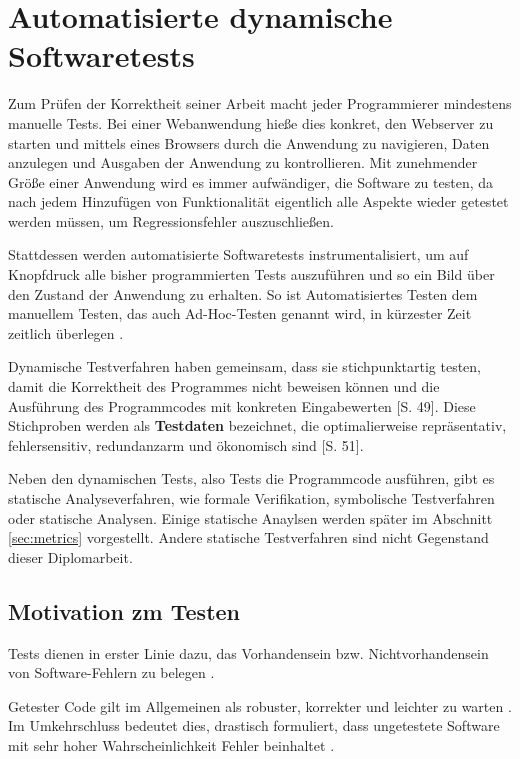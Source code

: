 \section{Automatisierte dynamische Softwaretests}

Zum Prüfen der Korrektheit seiner Arbeit macht jeder Programmierer mindestens manuelle Tests. Bei einer Webanwendung hieße dies konkret, den Webserver zu starten und mittels eines Browsers durch die Anwendung zu navigieren, Daten anzulegen und Ausgaben der Anwendung zu kontrollieren. Mit zunehmender Größe einer Anwendung wird es immer aufwändiger, die Software zu testen, da nach jedem Hinzufügen von Funktionalität eigentlich alle Aspekte wieder getestet werden müssen, um Regressionsfehler auszuschließen.

Stattdessen werden automatisierte Softwaretests instrumentalisiert, um auf Knopfdruck alle bisher programmierten Tests auszuführen und so ein Bild über den Zustand der Anwendung zu erhalten. So ist Automatisiertes Testen dem manuellem Testen, das auch Ad-Hoc-Testen genannt wird, in kürzester Zeit zeitlich überlegen \citep{rappin_rails_2011}.

Dynamische Testverfahren haben gemeinsam, dass sie stichpunktartig testen, damit die Korrektheit des Programmes nicht beweisen können und die Ausführung des Programmcodes mit konkreten Eingabewerten \cite{liggesmeyer_modultest_1990}[S. 49]. Diese Stichproben werden als \textbf{Testdaten} bezeichnet, die optimalierweise repräsentativ, fehlersensitiv, redundanzarm und ökonomisch sind \citep{liggesmeyer_modultest_1990}[S. 51].

Neben den dynamischen Tests, also Tests die Programmcode ausführen, gibt es statische Analyseverfahren, wie formale Verifikation, symbolische Testverfahren oder statische Analysen. Einige statische Anaylsen werden später im Abschnitt \ref{sec:metrics} vorgestellt. Andere statische Testverfahren sind nicht Gegenstand dieser Diplomarbeit.

\subsection{Motivation zm Testen}
Tests dienen in erster Linie dazu, das Vorhandensein bzw. Nichtvorhandensein von Software-Fehlern zu belegen \citep{goodliffe_code_2006}.

Getester Code gilt im Allgemeinen als robuster, korrekter und leichter zu warten \citep{rappin_rails_2011}. Im Umkehrschluss bedeutet dies, drastisch formuliert, dass ungetestete Software mit sehr hoher Wahrscheinlichkeit Fehler beinhaltet \citep{goodliffe_code_2006}.

